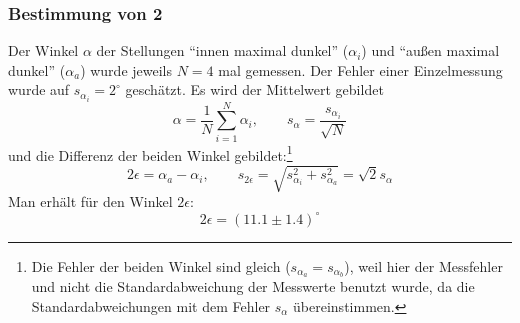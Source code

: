 \subsubsection{Bestimmung von 2\textepsilon}
Der Winkel $\alpha$ der Stellungen "`innen maximal dunkel"' ($\alpha_i$) und "`außen maximal dunkel"' ($\alpha_a$) wurde 
jeweils $N = 4$ mal gemessen. Der Fehler einer Einzelmessung wurde auf $s_{\alpha_i} = 2^\circ$ geschätzt. 
Es wird der Mittelwert gebildet
\begin{equation}
  \alpha = \frac{1}{N} \sum_{i=1}^{N} \alpha_i, \qquad s_{\alpha} = \frac{s_{\alpha_i}}{\sqrt{N}}
\end{equation}
und die Differenz der beiden Winkel gebildet:\footnote{Die Fehler der beiden Winkel sind gleich ($s_{\alpha_a} = s_{\alpha_b}$), weil hier der 
Messfehler und nicht die Standardabweichung der Messwerte benutzt wurde, da die Standardabweichungen mit dem Fehler $s_\alpha$ übereinstimmen.}
\begin{equation}
  2 \epsilon = \alpha_a - \alpha_i, \qquad s_{2\epsilon} = \sqrt{s_{\alpha_i}^2 + s_{\alpha_a}^2} = \sqrt{2} s_\alpha
\end{equation}
Man erhält für den Winkel $2\epsilon$:
\begin{equation}
  2\epsilon = (11.1 \pm 1.4)^\circ
\end{equation}